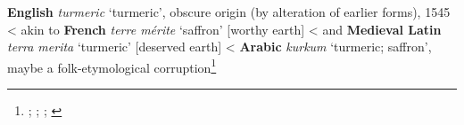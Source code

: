 \begin{etymology}\label{ety:turmeric}
\textbf{English} \textit{turmeric} `turmeric', obscure origin (by alteration of earlier forms), 1545
< akin to \textbf{French} \textit{terre mérite} `saffron' [worthy earth]
< and \textbf{Medieval Latin} \textit{terra merita} `turmeric' [deserved earth]
< \textbf{Arabic} \textit{kurkum} `turmeric; saffron', maybe a folk-etymological corruption\footnote{\textcite[s.v. turmeric]{oed}; \textcite[s.v. turmeric]{oe}; \textcite{guthrie_trade-language_2009}; \textcite[789]{klein_comprehensive_1971}}
\end{etymology}